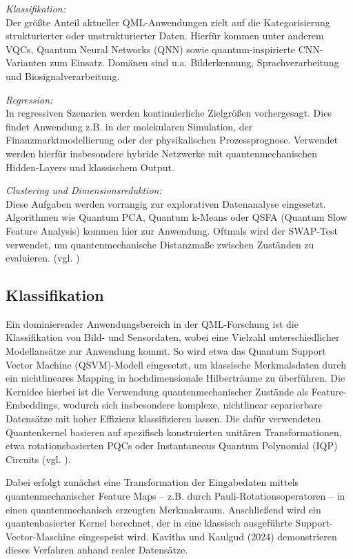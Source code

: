 \textit{Klassifikation:} \\
Der größte Anteil aktueller QML-Anwendungen zielt auf die Kategorisierung strukturierter oder unstrukturierter Daten. Hierfür kommen unter anderem VQCs, Quantum Neural Networks (QNN) sowie quantum-inspirierte CNN-Varianten zum Einsatz. Domänen sind u.a. Bilderkennung, Sprachverarbeitung und Biosignalverarbeitung.
\vspace{0.3cm}

\textit{Regression:} \\
In regressiven Szenarien werden kontinuierliche Zielgrößen vorhergesagt. Dies findet Anwendung z.B. in der molekularen Simulation, der Finanzmarktmodellierung oder der physikalischen Prozessprognose. Verwendet werden hierfür insbesondere hybride Netzwerke mit quantenmechanischen Hidden-Layers und klassischem Output.
\vspace{0.3cm}

\textit{Clustering und Dimensionsreduktion:}\\
Diese Aufgaben werden vorrangig zur explorativen Datenanalyse eingesetzt. Algorithmen wie Quantum PCA, Quantum k-Means oder QSFA (Quantum Slow Feature Analysis) kommen hier zur Anwendung. Oftmals wird der SWAP-Test verwendet, um quantenmechanische Distanzmaße zwischen Zuständen zu evaluieren. (vgl. \cite{chengNoisyIntermediatescaleQuantum2023})

\subsection{Klassifikation}
Ein dominierender Anwendungsbereich in der QML-Forschung ist die Klassifikation von Bild- und Sensordaten, wobei eine Vielzahl unterschiedlicher Modellansätze zur Anwendung kommt. So wird etwa das Quantum Support Vector Machine (QSVM)-Modell eingesetzt, um klassische Merkmalsdaten durch ein nichtlineares Mapping in hochdimensionale Hilberträume zu überführen. Die Kernidee hierbei ist die Verwendung quantenmechanischer Zustände als Feature-Embeddings, wodurch sich insbesondere komplexe, nichtlinear separierbare Datensätze mit hoher Effizienz klassifizieren lassen. Die dafür verwendeten Quantenkernel basieren auf spezifisch konstruierten unitären Transformationen, etwa rotationsbasierten PQCs oder Instantaneous Quantum Polynomial (IQP) Circuits (vgl. \cite{peral-garciaSystematicLiteratureReview2024}).

Dabei erfolgt zunächst eine Transformation der Eingabedaten mittels quantenmechanischer Feature Maps – z.B. durch Pauli-Rotationsoperatoren – in einen quantenmechanisch erzeugten Merkmalsraum. Anschließend wird ein quantenbasierter Kernel berechnet, der in eine klassisch ausgeführte Support-Vector-Maschine eingespeist wird. Kavitha und Kaulgud (2024) demonstrieren dieses Verfahren anhand realer Datensätze.

